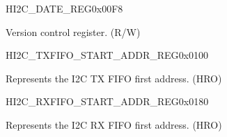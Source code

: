 \begin{register}{H}{I2C\_DATE\_REG}{0x00F8}\label{regdesc:I2CDATEREG}
%
\regnewline%
\begin{regdesc}\begin{reglist}
\label{fielddesc:I2CDATE}\item [I2C\_DATE] Version control register. (R/W)
\end{reglist}\end{regdesc}
\end{register}


\begin{register}{H}{I2C\_TXFIFO\_START\_ADDR\_REG}{0x0100}\label{regdesc:I2CTXFIFOSTARTADDRREG}
%
\regnewline%
\begin{regdesc}\begin{reglist}
\label{fielddesc:I2CTXFIFOSTARTADDR}\item [I2C\_TXFIFO\_START\_ADDR] Represents the I2C TX FIFO first address. (HRO)
\end{reglist}\end{regdesc}
\end{register}


\begin{register}{H}{I2C\_RXFIFO\_START\_ADDR\_REG}{0x0180}\label{regdesc:I2CRXFIFOSTARTADDRREG}
%
\regnewline%
\begin{regdesc}\begin{reglist}
\label{fielddesc:I2CRXFIFOSTARTADDR}\item [I2C\_RXFIFO\_START\_ADDR] Represents the I2C RX FIFO first address. (HRO)
\end{reglist}\end{regdesc}
\end{register}


